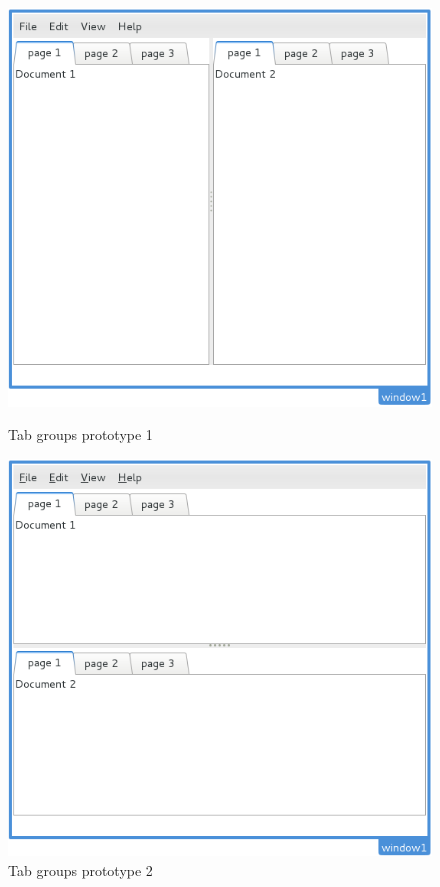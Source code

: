 \begin{figure}[H]
  \begin{minipage}[b]{0.5\linewidth}
    \centering
    \includegraphics[scale=0.40]{./images/tab-groups-proto-1}
    \caption{Tab groups prototype 1}\label{fig:TabGroupsProto1}
  \end{minipage}
  \hspace{0.5cm}
  \begin{minipage}[b]{0.5\linewidth}
    \centering
    \includegraphics[scale=0.40]{./images/tab-groups-proto-2}
    \caption{Tab groups prototype 2}\label{fig:TabGroupsProto2}
  \end{minipage}
\end{figure}

